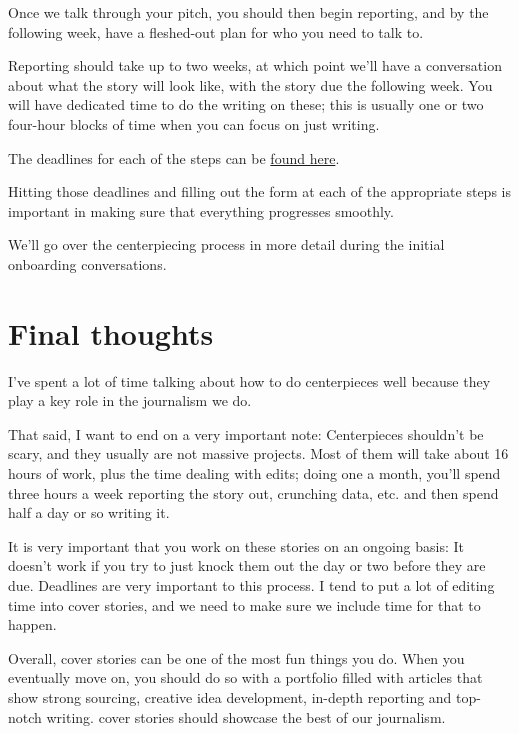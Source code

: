 \documentclass[
  11pt,
  american,
  letterpaperpaper,
  extrafontsizes,onecolumn,openright
  ]{memoir}
\begin{document}
Once we talk through your pitch, you should then begin reporting, and by the following week, have a fleshed-out plan for who you need to talk to.

Reporting should take up to two weeks, at which point we'll have a conversation about what the story will look like, with the story due the following week. You will have dedicated time to do the writing on these; this is usually one or two four-hour blocks of time when you can focus on just writing.

The deadlines for each of the steps can be \href{https://bizj.us/1qk3ql}{found here}.

Hitting those deadlines and filling out the form at each of the appropriate steps is important in making sure that everything progresses smoothly.

\leavevmode{}%
\begin{greybox}[frametitle=Onboarding Path]
We'll go over the centerpiecing process in more detail during the initial onboarding conversations.

\end{greybox}

\hypertarget{final-thoughts-4}{%
\section*{Final thoughts}\label{final-thoughts-4}}

I've spent a lot of time talking about how to do centerpieces well because they play a key role in the journalism we do.

That said, I want to end on a very important note: Centerpieces shouldn't be scary, and they usually are not massive projects. Most of them will take about 16 hours of work, plus the time dealing with edits; doing one a month, you'll spend three hours a week reporting the story out, crunching data, etc. and then spend half a day or so writing it.

It is very important that you work on these stories on an ongoing basis: It doesn't work if you try to just knock them out the day or two before they are due. Deadlines are very important to this process. I tend to put a lot of editing time into cover stories, and we need to make sure we include time for that to happen.

Overall, cover stories can be one of the most fun things you do. When you eventually move on, you should do so with a portfolio filled with articles that show strong sourcing, creative idea development, in-depth reporting and top-notch writing. cover stories should showcase the best of our journalism.
\end{document}
